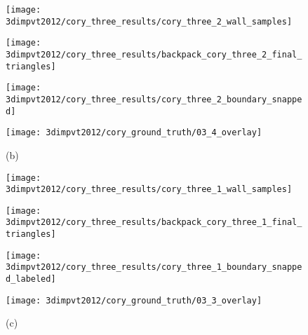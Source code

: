 \documentclass[12pt,onecolumn,oneside]{book}
\begin{document}
\begin{figure}[t]

\begin{minipage}[b]{0.24\linewidth}
  \centering
  \centerline{\texttt{[image: 3dimpvt2012/cory\_three\_results/cory\_three\_2\_wall\_samples]}}
\end{minipage}
\hfill
\begin{minipage}[b]{0.24\linewidth}
  \centering
  \centerline{\texttt{[image: 3dimpvt2012/cory\_three\_results/backpack\_cory\_three\_2\_final\_triangles]}}
\end{minipage}
\hfill
\begin{minipage}[b]{0.24\linewidth}
  \centering
  \centerline{\texttt{[image: 3dimpvt2012/cory\_three\_results/cory\_three\_2\_boundary\_snapped]}}
\end{minipage}
\hfill
\begin{minipage}[b]{0.24\linewidth}
  \centering
  \centerline{\texttt{[image: 3dimpvt2012/cory\_ground\_truth/03\_4\_overlay]}}
\end{minipage}
\centerline{(b)}
\linebreak

\begin{minipage}[b]{0.24\linewidth}
  \centering
  \centerline{\texttt{[image: 3dimpvt2012/cory\_three\_results/cory\_three\_1\_wall\_samples]}}
\end{minipage}
\hfill
\begin{minipage}[b]{0.24\linewidth}
  \centering
  \centerline{\texttt{[image: 3dimpvt2012/cory\_three\_results/backpack\_cory\_three\_1\_final\_triangles]}}
\end{minipage}
\hfill
\begin{minipage}[b]{0.24\linewidth}
  \centering
  \centerline{\texttt{[image: 3dimpvt2012/cory\_three\_results/cory\_three\_1\_boundary\_snapped\_labeled]}}
\end{minipage}
\hfill
\begin{minipage}[b]{0.24\linewidth}
  \centering
  \centerline{\texttt{[image: 3dimpvt2012/cory\_ground\_truth/03\_3\_overlay]}}
\end{minipage}
\centerline{(c)}
\linebreak


\end{figure}
\end{document}
